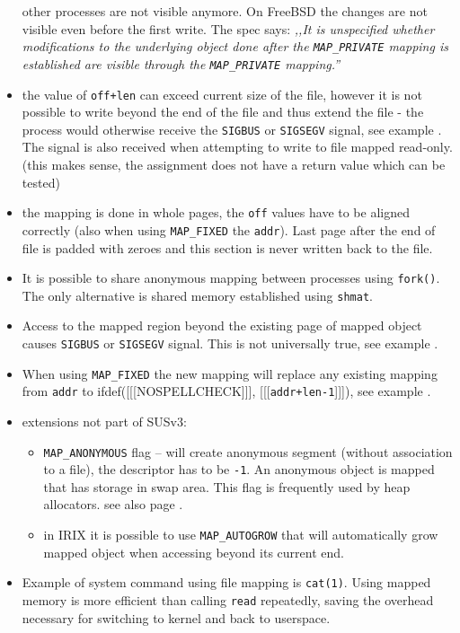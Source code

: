 \begin{itemize}
other processes are not visible anymore.
On FreeBSD the changes are not visible even before the first write.
The spec says:
\emph{,,It is unspecified whether modifications to the underlying object done
after the \texttt{MAP\_PRIVATE} mapping is established are visible through the
\texttt{MAP\_PRIVATE} mapping.''}
\item the value of \texttt{off+l{}en} can exceed current size of the file,
however it is not possible to write beyond the end of the file and thus
extend the file - the process would otherwise receive the \texttt{SIGBUS} or
\texttt{SIGSEGV} signal, see example .
The signal is also received when attempting to write to file mapped read-only.
(this makes sense, the assignment does not have a return value which can be
tested)
\item the mapping is done in whole pages, the \texttt{off} values have to
be aligned correctly (also when using \texttt{MAP\_FIXED} the \texttt{addr}).
Last page after the end of file is padded with zeroes and this section is
never written back to the file.
\item It is possible to share anonymous mapping between processes using
\texttt{fork()}. The only alternative is shared memory established using
\texttt{shmat}.
\item Access to the mapped region beyond the existing page of mapped object
causes \texttt{SIGBUS} or \texttt{SIGSEGV} signal.
This is not universally true, see example .
\item When using \texttt{MAP\_FIXED} the new mapping will replace any existing
mapping from \texttt{addr} to
ifdef([[[NOSPELLCHECK]]], [[[\texttt{addr+l{}en-1}]]]), see example
.
\item extensions not part of SUSv3:
    \begin{itemize}
    \setlength{\itemsep}{0.8\itemsep}
    \item \texttt{MAP\_ANONYMOUS} flag -- will create anonymous segment
    (without association to a file), the descriptor has to be \texttt{-1}.
    An anonymous object is mapped that has storage in swap area.
    This flag is frequently used by heap allocators.
    see also page \pageref{SOLARIS_PROC_ADDR_SPACE}.
    \item in IRIX it is possible to use \texttt{MAP\_AUTOGROW} that will
    automatically grow mapped object when accessing beyond its current end.
    \end{itemize}
\item Example of system command using file mapping is \texttt{cat(1)}. 
Using mapped memory is more efficient than calling \texttt{read} repeatedly,
saving the overhead necessary for switching to kernel and back to userspace.
\end{itemize}

